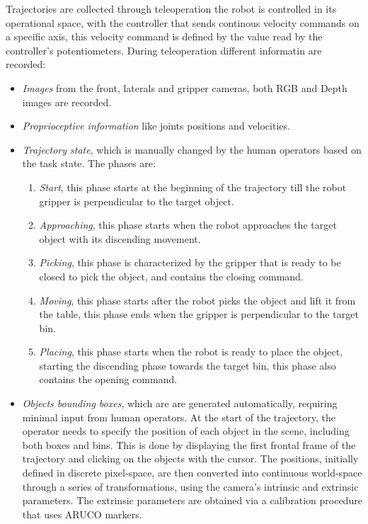 
Trajectories are collected through teleoperation the robot is controlled in its operational space, with the controller that sends continous velocity commands on a specific axis, this velocity command is defined by the value read by the controller's potentiometers.
During teleoperation different informatin are recorded:
\begin{itemize}
    \item \textit{Images} from the front, laterals and gripper cameras, both RGB and Depth images are recorded.
    \item \textit{Proprioceptive information} like joints positions and velocities.
    \item \textit{Trajectory state}, which is manually changed by the human operators based on the task state. The phases are:
        \begin{enumerate}
            \item \textit{Start}, this phase starts at the beginning of the trajectory till the robot gripper is perpendicular to the target object.
            \item \textit{Approaching}, this phase starts when the robot approaches the target object with its discending movement.
            \item \textit{Picking}, this phase is characterized by the gripper that is ready to be closed to pick the object, and contains the closing command.
            \item \textit{Moving}, this phase starts after the robot picks the object and lift it from the table, this phase ends when the gripper is perpendicular to the target bin.
            \item \textit{Placing}, this phase starts when the robot is ready to place the object, starting the discending phase towards the target bin, this phase also contains the opening command.
        \end{enumerate}
    \item \textit{Objects bounding boxes}, which are are generated automatically, requiring minimal input from human operators. At the start of the trajectory, the operator needs to specify the position of each object in the scene, including both boxes and bins. This is done by displaying the first frontal frame of the trajectory and clicking on the objects with the cursor. The positions, initially defined in discrete pixel-space, are then converted into continuous world-space through a series of transformations, using the camera's intrinsic and extrinsic parameters. The extrinsic parameters are obtained via a calibration procedure that uses ARUCO markers.
\end{itemize}
